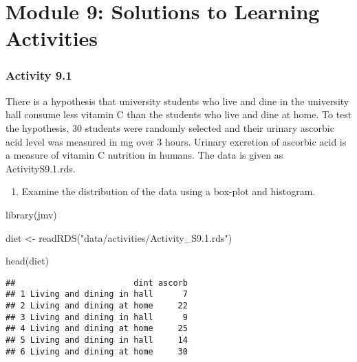 \documentclass[
]{memoir}
\newenvironment{Shaded}{\begin{snugshade}}{\end{snugshade}}
\newcommand{\FunctionTok}[1]{\textcolor[rgb]{0.00,0.00,0.00}{#1}}
\newcommand{\NormalTok}[1]{#1}
\newcommand{\OtherTok}[1]{\textcolor[rgb]{0.56,0.35,0.01}{#1}}
\newcommand{\StringTok}[1]{\textcolor[rgb]{0.31,0.60,0.02}{#1}}
\providecommand{\tightlist}{%
  \setlength{\itemsep}{0pt}\setlength{\parskip}{0pt}}
\begin{document}
\hypertarget{module-9-solutions-to-learning-activities}{%
\chapter*{Module 9: Solutions to Learning Activities}\label{module-9-solutions-to-learning-activities}}

\hypertarget{activity-9.1}{%
\subsection*{Activity 9.1}\label{activity-9.1}}

There is a hypothesis that university students who live and dine in the university hall consume less vitamin C than the students who live and dine at home. To test the hypothesis, 30 students were randomly selected and their urinary ascorbic acid level was measured in mg over 3 hours. Urinary excretion of ascorbic acid is a measure of vitamin C nutrition in humans. The data is given as ActivityS9.1.rds.

\begin{enumerate}
\def\labelenumi{\alph{enumi})}
\tightlist
\item
  Examine the distribution of the data using a box-plot and histogram.
\end{enumerate}

\begin{Shaded}
\begin{Highlighting}[]
\FunctionTok{library}\NormalTok{(jmv)}

\NormalTok{diet }\OtherTok{\textless{}{-}} \FunctionTok{readRDS}\NormalTok{(}\StringTok{"data/activities/Activity\_S9.1.rds"}\NormalTok{)}

\FunctionTok{head}\NormalTok{(diet)}
\end{Highlighting}
\end{Shaded}

\begin{verbatim}
##                        dint ascorb
## 1 Living and dining in hall      7
## 2 Living and dining at home     22
## 3 Living and dining in hall      9
## 4 Living and dining at home     25
## 5 Living and dining in hall     14
## 6 Living and dining at home     30
\end{verbatim}
\end{document}
